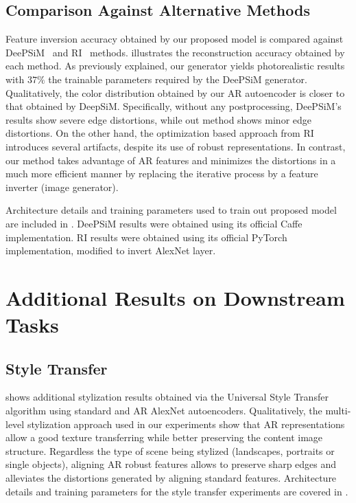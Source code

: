 \subsection{Comparison Against Alternative Methods}
\label{sec:supp_results_comparison}

Feature inversion accuracy obtained by our proposed model is compared against DeePSiM~\cite{dosovitskiy_2016_generating} and RI~\cite{engstrom_2019_adversarial} methods.  illustrates the reconstruction accuracy obtained by each method. As previously explained, our generator yields photorealistic results with $37\%$ the trainable parameters required by the DeePSiM generator. Qualitatively, the color distribution obtained by our AR autoencoder is closer to that obtained by DeepSiM. Specifically, without any postprocessing, DeePSiM's results show severe edge distortions, while out method shows minor edge distortions. On the other hand, the optimization based approach from RI introduces several artifacts, despite its use of robust representations. In contrast, our method takes advantage of AR features and minimizes the distortions in a much more efficient manner by replacing the iterative process by a feature inverter (image generator).

Architecture details and training parameters used to train out proposed model are included in . DeePSiM results were obtained using its official Caffe implementation. RI results were obtained using its official PyTorch implementation, modified to invert AlexNet  layer.


\section{Additional Results on Downstream Tasks}
\label{sec:supp_additional}
    \subsection{Style Transfer}
    \label{sec:supp_additional_st}
     shows additional stylization results obtained via the Universal Style Transfer algorithm using standard and AR AlexNet autoencoders. Qualitatively, the multi-level stylization approach used in our experiments show that AR representations allow a good texture transferring while better preserving the content image structure. Regardless the type of scene being stylized (\eg landscapes, portraits or single objects), aligning AR robust features allows to preserve sharp edges and alleviates the distortions generated by aligning standard features. Architecture details and training parameters for the style transfer experiments are covered in .
    


